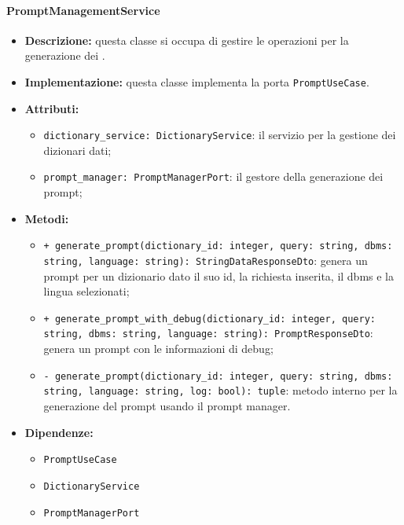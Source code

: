 \paragraph{PromptManagementService} \label{PromptManagementService}
\begin{itemize}
    \item \textbf{Descrizione:} questa classe si occupa di gestire le operazioni per la generazione dei .
    \item \textbf{Implementazione:} questa classe implementa la porta \texttt{PromptUseCase}. 
    \item \textbf{Attributi:}
    \begin{itemize}
        \item \texttt{dictionary\_service: DictionaryService}: il servizio per la gestione dei dizionari dati;
        \item \texttt{prompt\_manager: PromptManagerPort}: il gestore della generazione dei prompt;
    \end{itemize}
    \item \textbf{Metodi:}
    \begin{itemize}
        \item \texttt{+ generate\_prompt(dictionary\_id: integer, query: string, dbms: string, language: string): StringDataResponseDto}: genera un prompt per un dizionario dato il suo id, la richiesta inserita, il dbms e la lingua selezionati;
        \item \texttt{+ generate\_prompt\_with\_debug(dictionary\_id: integer, query: string, dbms: string, language: string): PromptResponseDto}: genera un prompt con le informazioni di debug;
        \item \texttt{- generate\_prompt(dictionary\_id: integer, query: string, dbms: string, language: string, log: bool): tuple}: metodo interno per la generazione del prompt usando il prompt manager.
    \end{itemize}
    \item \textbf{Dipendenze:}
    \begin{itemize}
        \item \texttt{PromptUseCase}
        \item \texttt{DictionaryService}
        \item \texttt{PromptManagerPort}
    \end{itemize}
\end{itemize}  